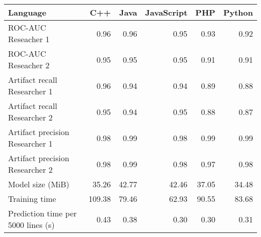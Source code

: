 \begin{tabular}{lrrrrr}
\toprule
Language &    C++ &  Java &  JavaScript &   PHP &  Python \\
\midrule
ROC-AUC Reseacher 1                &   0.96 &  0.96 &        0.95 &  0.93 &    0.92 \\
ROC-AUC Reseacher 2                &   0.95 &  0.95 &        0.95 &  0.91 &    0.91 \\
Artifact recall Researcher 1       &   0.96 &  0.94 &        0.94 &  0.89 &    0.88 \\
Artifact recall Researcher 2       &   0.95 &  0.94 &        0.95 &  0.88 &    0.87 \\
Artifact precision Researcher 1    &   0.98 &  0.99 &        0.98 &  0.99 &    0.99 \\
Artifact precision Researcher 2    &   0.98 &  0.99 &        0.98 &  0.97 &    0.98 \\
Model size (MiB)                   &  35.26 & 42.77 &       42.46 & 37.05 &   34.48 \\
Training time                      & 109.38 & 79.46 &       62.93 & 90.55 &   83.68 \\
Prediction time per 5000 lines (s) &   0.43 &  0.38 &        0.30 &  0.30 &    0.31 \\
\bottomrule
\end{tabular}
